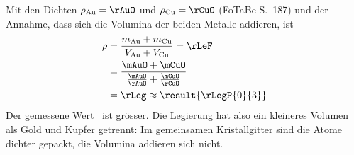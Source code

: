 Mit den Dichten $\rho_\text{Au} = \rAuO$ und $\rho_\text{Cu} = \rCuO$ (FoTaBe S.~187) und der Annahme, dass sich die Volumina der beiden Metalle addieren, ist
\begin{align}
 \rho &= \frac{m_\text{Au}+m_\text{Cu}}{V_\text{Au}+V_\text{Cu}} = \rLeF \\
   &= \frac{\mAuO+\mCuO}{\frac{\mAuO}{\rAuO}+\frac{\mCuO}{\rCuO}} \\
   &= \rLeg \approx \result{\rLegP{0}{3}}
\end{align}
Der gemessene Wert \rMeO\ ist grösser. Die Legierung hat also ein kleineres Volumen als Gold und Kupfer getrennt: Im gemeinsamen Kristallgitter sind die Atome dichter gepackt, die Volumina addieren sich nicht.

